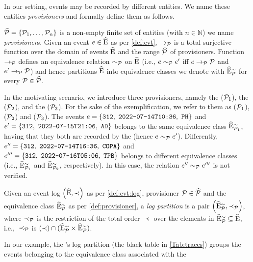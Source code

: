 \begin{newj}
In our setting, events may be recorded by different entities. We name these entities \emph{provisioners} and formally define them as follows.
\begin{definition}[Provisioner]\label{def:provisioner}
	$\widehat{\mathcal{P}} = \{ \mathcal{P}_1, \ldots, \mathcal{P}_n \}$ is a non-empty finite set of entities (with $n \in \mathbb{N}$) we name \emph{provisioner}s. 
	Given an event $e \in \widehat{\mathrm{E}}$ as per \cref{def:evt}, $\to_{\mathcal{P}}$ is a total surjective function over the domain of events $\widehat{\mathrm{E}}$ and the range $\widehat{\mathcal{P}}$ of provisioners. Function $\to_{\mathcal{P}}$ defines an equivalence relation $\sim_{\mathcal{P}}$ on $\widehat{\mathrm{E}}$ (i.e., $e \sim_{\mathcal{P}} e'$ iff $e \to_{\mathcal{P}} \mathcal{P}$ and $e' \to_{\mathcal{P}} \mathcal{P}$) and hence partitions $\widehat{\mathrm{E}}$ into equivalence classes we denote with $\widehat{\mathrm{E}}^{\sim}_{\mathcal{P}}$ for every $\mathcal{P} \in \widehat{\mathcal{P}}$.
\end{definition}
In the motivating scenario, we introduce three provisioners, namely the  ($\mathcal{P}_1$), the  ($\mathcal{P}_2$), and the ($\mathcal{P}_3$). For the sake of the exemplification, we refer to them as ($\mathcal{P}_1$), ($\mathcal{P}_2$) and ($\mathcal{P}_3$).  The events $\Evt=\{\texttt{312},\ \texttt{2022-07-14T10:36},\ \texttt{PH}\}$ and $\Evt'=\{\texttt{312},\ \texttt{2022-07-15T21:06},\ \texttt{AD}\}$ belongs to the same equivalence class $\widehat{\mathrm{E}}^{\sim}_{\mathcal{P}_1}$, having that they both are recorded by the  (hence $e \sim_{\mathcal{P}} e'$). Differently, $\Evt''=\{\texttt{312},\ \texttt{2022-07-14T16:36},\ \texttt{COPA}\}$ and $\Evt'''=\{\texttt{312},\ \texttt{2022-07-16T05:06},\ \texttt{TPB}\}$ belongs to different equivalence classes (i.e., $\widehat{\mathrm{E}}^{\sim}_{\mathcal{P}_1}$ and $\widehat{\mathrm{E}}^{\sim}_{\mathcal{P}_2}$, respectively). In this case, the relation $e'' \sim_{\mathcal{P}} e'''$ is not verified.

\begin{definition}\label{def:partition}
	Given an event log $\left( \widehat{\mathrm{E}}, \prec \right)$ as per \cref{def:evt:log}, provisioner $\mathcal{P} \in \widehat{\mathcal{P}}$ and the equivalence class $\widehat{\mathrm{E}}^{\sim}_{\mathcal{P}}$ as per \cref{def:provisioner}, a \emph{log partition} is a pair $\left( \widehat{\mathrm{E}}^{\sim}_{\mathcal{P}}, \prec_{\mathcal{P}} \right)$, where $\prec_{\mathcal{P}}$ is the restriction of the total order $\prec$ over the elements in $\widehat{\mathrm{E}}^{\sim}_{\mathcal{P}} \subseteq \widehat{\mathrm{E}}$, i.e., $\;\prec_{\mathcal{P}}$ is $(\prec) \cap (\widehat{\mathrm{E}}^{\sim}_{\mathcal{P}} \times \widehat{\mathrm{E}}^{\sim}_{\mathcal{P}})$.
\end{definition}
%
 In our example, the 's log partition (the black table in \cref{Tab:traces}) groups the events belonging to the equivalence class associated with the 


\end{newj}
